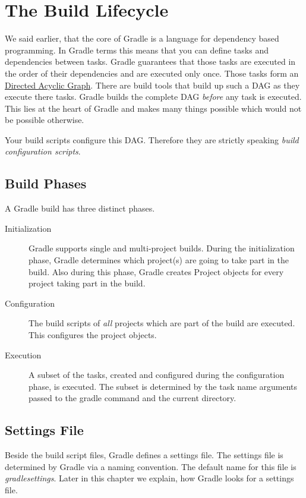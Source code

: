 \chapter{The Build Lifecycle} %
\label{cha:the_build_lifecycle}
We said earlier, that the core of Gradle is a language for dependency based programming. In Gradle terms this means that you can define tasks and dependencies between tasks. Gradle guarantees that those tasks are executed in the order of their dependencies and are executed only once. Those tasks form an \href{http://en.wikipedia.org/wiki/Directed_acyclic_graph}{Directed Acyclic Graph}. There are build tools that build up such a DAG as they execute there tasks. Gradle builds the complete DAG \emph{before} any task is executed. This lies at the heart of Gradle and makes many things possible which would not be possible otherwise. 

Your build scripts configure this DAG. Therefore they are strictly speaking \emph{build configuration scripts}.    

\section{Build Phases} %
\label{sec:build_phases}
A Gradle build has three distinct phases.
\begin{description}
	\item[Initialization] Gradle supports single and multi-project builds. During the initialization phase, Gradle determines which project(s) are going to take part in the build. Also during this phase, Gradle creates Project objects for every project taking part in the build. 
	\item[Configuration] The build scripts of \emph{all} projects which are part of the build are executed. This configures the project objects.
	\item[Execution] A subset of the tasks, created and configured during the configuration phase, is executed. The subset is determined by the task name arguments passed to the gradle command and the current directory.
\end{description}

\section{Settings File} %
\label{sec:settings_file}
Beside the build script files, Gradle defines a settings file. The settings file is determined by Gradle via a naming convention. The default name for this file is \emph{gradlesettings}. Later in this chapter we explain, how Gradle looks for a settings file. 

